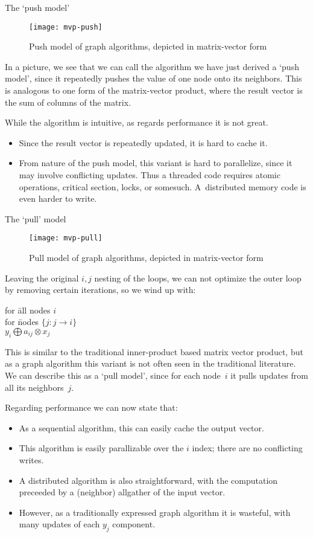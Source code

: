  {The `push model'}

\begin{figure}[ht]
  \texttt{[image: mvp-push]}
  \caption{Push model of graph algorithms, depicted in matrix-vector form}
  \label{fig:mvp-push}
\end{figure}

In a picture, we see that we can call the algorithm we have just derived
a `push model',
since it repeatedly pushes the value of one node onto its neighbors.
This is analogous to one form of the matrix-vector product,
where the result vector is the sum of columns of the matrix.

While the algorithm is intuitive, as regards performance it is not great.
\begin{itemize}
\item Since the result vector is repeatedly updated, it is hard to cache it.
\item From nature of the push model, this variant is hard to parallelize,
  since it may involve conflicting updates.
  Thus a threaded code requires atomic operations, critical section, locks,
  or somesuch. A~distributed memory code is even harder to write.
\end{itemize}

 {The `pull' model}

\begin{figure}[ht]
  \texttt{[image: mvp-pull]}
  \caption{Pull model of graph algorithms, depicted in matrix-vector form}
  \label{fig:mvp-pull}
\end{figure}

Leaving the original $i,j$ nesting of the loops,
we can not optimize the outer loop by removing certain iterations,
so we wind up with:

\begin{tabbing}
for \=all nodes $i$\\
\> for \=nodes $\{ j\colon j\rightarrow i\}$\\
\>\> $y_i \bigoplus a_{ij}\otimes x_j$\\
\end{tabbing}

This is similar to the traditional inner-product based matrix vector product,
but as a graph algorithm this variant is not often seen in the traditional literature.
We can describe this as a `pull model', since for each node~$i$ it pulls updates
from all its neighbors~$j$.

Regarding performance we can now state that:
\begin{itemize}
\item As a sequential algorithm, this can easily cache the output vector.
\item This algorithm is easily parallizable over the $i$ index;
  there are no conflicting writes.
\item A distributed algorithm is also straightforward, with the computation
  preceeded by a (neighbor) allgather of the input vector.
\item However, as a traditionally expressed graph algorithm it is wasteful,
  with many updates of each $y_j$ component.
\end{itemize}

